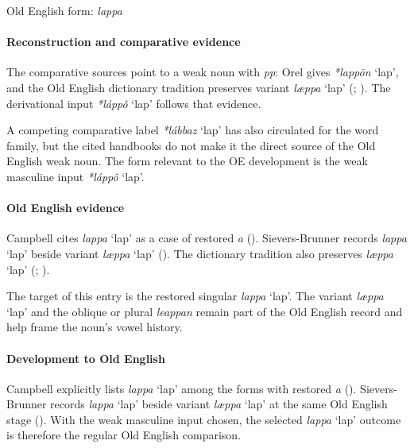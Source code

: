 \documentclass[
  british,
  a4paper,
]{article}
\providecommand{\Recon}[1]{\emph{*#1}}
\begin{document}
Old English form: \emph{lappa}

\paragraph{Reconstruction and comparative
evidence}\label{reconstruction-and-comparative-evidence-93}

The comparative sources point to a weak noun with \emph{pp}: Orel gives
\Recon{lappōn} `lap', and the Old English dictionary tradition preserves
variant \emph{læppa} `lap' (;
). The derivational
input \Recon{láppô} `lap' follows that evidence.

A competing comparative label \Recon{lábbaz} `lap' has also circulated
for the word family, but the cited handbooks do not make it the direct
source of the Old English weak noun. The form relevant to the OE
development is the weak masculine input \Recon{láppô} `lap'.

\paragraph{Old English evidence}\label{old-english-evidence-93}

Campbell cites \emph{lappa} `lap' as a case of restored \emph{a}
(). Sievers-Brunner
records \emph{lappa} `lap' beside variant \emph{læppa} `lap'
(). The
dictionary tradition also preserves \emph{læppa} `lap'
(;
).

The target of this entry is the restored singular \emph{lappa} `lap'.
The variant \emph{læppa} `lap' and the oblique or plural \emph{leappan}
remain part of the Old English record and help frame the noun's vowel
history.

\paragraph{Development to Old
English}\label{development-to-old-english-93}

Campbell explicitly lists \emph{lappa} `lap' among the forms with
restored \emph{a} (). Sievers-Brunner records \emph{lappa} `lap' beside variant
\emph{læppa} `lap' at the same Old English stage
(). With the
weak masculine input chosen, the selected \emph{lappa} `lap' outcome is
therefore the regular Old English comparison.
\end{document}
